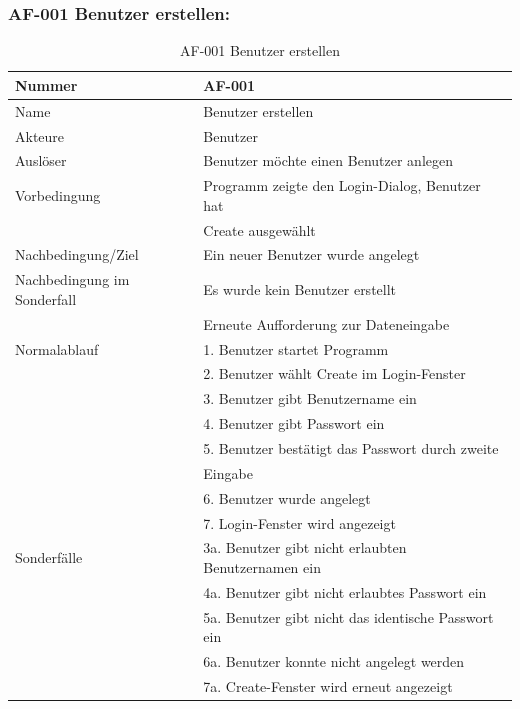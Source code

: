 \documentclass[13pt,a4paper,bibliography=totocnumbered,listof=totocnumbered]{scrartcl}
\begin{document}
\subsubsection{AF-001 Benutzer erstellen:}
\begin{table}[!h]
	\centering
	\begin{tabular}{|l|l|}
		\hline
		Nummer & AF-001\\
		\hline
		Name & Benutzer erstellen\\
		\hline
		Akteure & Benutzer\\
		\hline
		Auslöser & Benutzer möchte einen Benutzer anlegen\\
		\hline
		Vorbedingung & Programm zeigte den Login-Dialog, Benutzer hat \\ &  Create ausgewählt\\
		\hline
		Nachbedingung/Ziel & Ein neuer Benutzer wurde angelegt \\
		\hline
		Nachbedingung im Sonderfall & Es wurde kein Benutzer erstellt \\ & Erneute Aufforderung zur Dateneingabe\\
		\hline
		Normalablauf & 1. Benutzer startet Programm \\ & 2. Benutzer wählt Create im Login-Fenster\\ & 3. Benutzer gibt Benutzername ein \\ & 4. Benutzer gibt Passwort ein \\ & 5. Benutzer bestätigt das Passwort durch zweite\\ &Eingabe\\& 6. Benutzer wurde angelegt\\& 7. Login-Fenster wird angezeigt \\
		\hline
		Sonderfälle & 3a. Benutzer gibt nicht erlaubten Benutzernamen ein \\ & 4a. Benutzer gibt nicht erlaubtes Passwort ein \\& 5a. Benutzer gibt nicht das identische Passwort ein\\& 6a. Benutzer konnte nicht angelegt werden \\& 7a. Create-Fenster wird erneut angezeigt\\
		\hline
	\end{tabular}
	\caption{AF-001 Benutzer erstellen}
	\label{tab:AF-001 Benutzer erstellen}
\end{table}
\pagebreak
\end{document}
